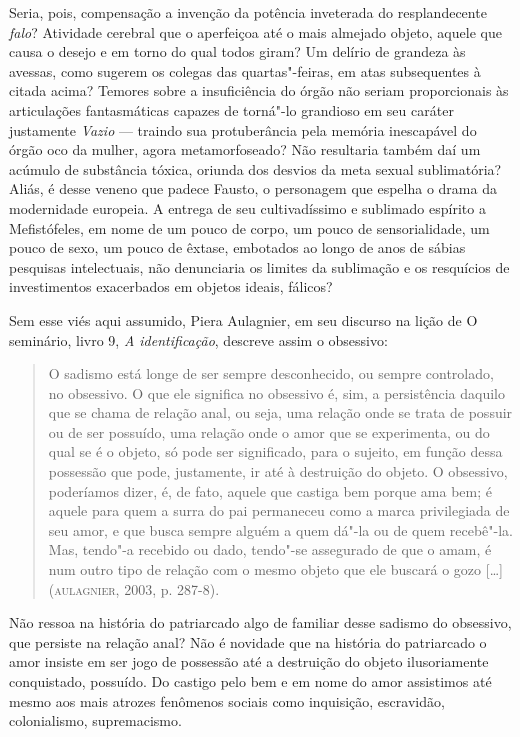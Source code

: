 Seria, pois, compensação a invenção da potência inveterada do
resplandecente \emph{falo}? Atividade cerebral que o aperfeiçoa até o
mais almejado objeto, aquele que causa o desejo e em torno do qual todos
giram? Um delírio de grandeza às avessas, como sugerem os colegas das
quartas"-feiras, em atas subsequentes à citada acima? Temores sobre a
insuficiência do órgão não seriam proporcionais às articulações
fantasmáticas capazes de torná"-lo grandioso em seu caráter justamente
\emph{Vazio} --- traindo sua protuberância pela memória inescapável do
órgão oco da mulher, agora metamorfoseado? Não resultaria também daí um
acúmulo de substância tóxica, oriunda dos desvios da meta sexual
sublimatória? Aliás, é desse veneno que padece Fausto, o personagem que
espelha o drama da modernidade europeia. A entrega de seu cultivadíssimo
e sublimado espírito a Mefistófeles, em nome de um pouco de corpo, um
pouco de sensorialidade, um pouco de sexo, um pouco de êxtase, embotados
ao longo de anos de sábias pesquisas intelectuais, não denunciaria os
limites da sublimação e os resquícios de investimentos exacerbados em
objetos ideais, fálicos?

Sem esse viés aqui assumido, Piera Aulagnier, em seu discurso na lição
 de O seminário, livro 9, \emph{A identificação}, descreve assim o
obsessivo:

\begin{quote}
O sadismo está longe de ser sempre desconhecido, ou sempre controlado,
no obsessivo. O que ele significa no obsessivo é, sim, a persistência
daquilo que se chama de relação anal, ou seja, uma relação onde se trata
de possuir ou de ser possuído, uma relação onde o amor que se
experimenta, ou do qual se é o objeto, só pode ser significado, para o
sujeito, em função dessa possessão que pode, justamente, ir até à
destruição do objeto. O obsessivo, poderíamos dizer, é, de fato, aquele
que castiga bem porque ama bem; é aquele para quem a surra do pai
permaneceu como a marca privilegiada de seu amor, e que busca sempre
alguém a quem dá"-la ou de quem recebê"-la. Mas, tendo"-a recebido ou dado,
tendo"-se assegurado de que o amam, é num outro tipo de relação com o
mesmo objeto que ele buscará o gozo {[}\ldots{}{]} (\textsc{aulagnier}, 2003,
p. 287-8).
\end{quote}

Não ressoa na história do patriarcado algo de familiar desse sadismo do
obsessivo, que persiste na relação anal? Não é novidade que na história
do patriarcado o amor insiste em ser jogo de possessão até a destruição
do objeto ilusoriamente conquistado, possuído. Do castigo pelo bem e em
nome do amor assistimos até mesmo aos mais atrozes fenômenos sociais
como inquisição, escravidão, colonialismo, supremacismo.

